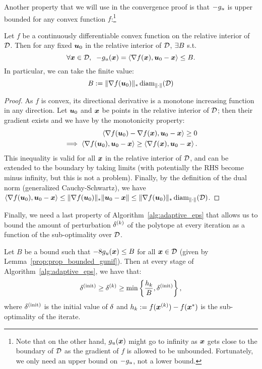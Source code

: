 Another property that we will use in the convergence proof is that $-g_u$ is upper bounded for any convex function $f$:\footnote{Note that on the other hand, $g_u(\bm{x})$ might go to infinity as $\bm{x}$ gets close to the boundary of $\mathcal{D}$ as the gradient of $f$ is allowed to be unbounded. Fortunately, we only need an upper bound on $-g_u$, not a lower bound.}
\begin{lemma}
\label{prop:prop_bounded_gunif}
Let $f$ be a continuously differentiable convex function on the relative interior of $\mathcal{D}$. Then for any fixed $\bm{u}_0$ in the relative interior of $\mathcal{D}$, $\exists B$
s.t. 
\begin{equation} 
\forall \bm{x}\in\mathcal{D}, \;\; -g_u(\bm{x}) = \left\langle \nabla f(\bm{x}) , \bm{u}_0-\bm{x} \right\rangle \leq B.
\end{equation}
In particular, we can take the finite value:
\begin{equation} \label{eq:uniformBound}
	B := \| \nabla f(\bm{u}_0) \|_* \operatorname{diam}_{\| \cdot \|} (\mathcal{D})
\end{equation}
\end{lemma}
\begin{proof}
As $f$ is convex, its directional derivative is a monotone increasing function in any direction. Let $\bm{u}_0$ and $\bm{x}$ be points in the relative interior of $\mathcal{D}$; then their gradient exists and we have by the monotonicity property:
\begin{align*}
\left\langle \nabla f(\bm{u}_0) - \nabla f(\bm{x}) , \bm{u}_0-\bm{x} \right\rangle \geq 0 \\
\implies \left\langle \nabla f(\bm{u}_0) , \bm{u}_0-\bm{x} \right\rangle \geq \left\langle \nabla f(\bm{x}) , \bm{u}_0-\bm{x} \right\rangle . 
\end{align*}
This inequality is valid for all $\bm{x}$ in the relative interior of $\mathcal{D}$, and can be extended to the boundary by taking limits (with potentially the RHS become minus infinity, but this is not a problem). Finally, by the definition of the dual norm (generalized Cauchy-Schwartz), we have $ \left\langle \nabla f(\bm{u}_0) , \bm{u}_0-\bm{x} \right\rangle \leq \| \nabla f(\bm{u}_0) \|_* \| \bm{u}_0 - \bm{x} \| \leq \| \nabla f(\bm{u}_0) \|_*  \operatorname{diam}_{\| \cdot \|} (\mathcal{D})$.
\end{proof}

Finally, we need a last property of Algorithm~\ref{alg:adaptive_eps} that allows us to bound the amount of perturbation $\delta^{(k)}$ of the polytope
at every iteration as a function of the sub-optimality over $\mathcal{D}$.  
\begin{lemma}
	\label{prop:eps_k_properties}
	Let $B$ be a bound such that $-8g_u(\bm{x})\leq B$ for all $\bm{x} \in \mathcal{D}$ (given by Lemma~\ref{prop:prop_bounded_gunif}). Then at every stage of Algorithm~\ref{alg:adaptive_eps}, we have that:
	$$
		\delta^{(\mathrm{init})} \geq \delta^{(k)}\geq\min\left\{\frac{h_k}{B},\delta^{(\mathrm{init})}\right\},
    $$
	where $\delta^{(\mathrm{init})}$ is the initial value of $\delta$ and $h_k := f(\bm{x}^{(k)})-f(\bm{x}^*)$ is the sub-optimality of the iterate.
\end{lemma}

